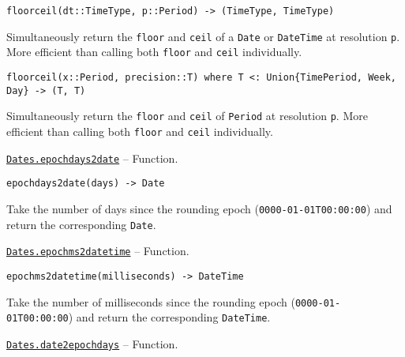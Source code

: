 \begin{adjustwidth}{2em}{0pt}


\begin{verbatim}
floorceil(dt::TimeType, p::Period) -> (TimeType, TimeType)
\end{verbatim}

Simultaneously return the \texttt{floor} and \texttt{ceil} of a \texttt{Date} or \texttt{DateTime} at resolution \texttt{p}. More efficient than calling both \texttt{floor} and \texttt{ceil} individually.




\begin{lstlisting}
floorceil(x::Period, precision::T) where T <: Union{TimePeriod, Week, Day} -> (T, T)
\end{lstlisting}

Simultaneously return the \texttt{floor} and \texttt{ceil} of \texttt{Period} at resolution \texttt{p}.  More efficient than calling both \texttt{floor} and \texttt{ceil} individually.



\end{adjustwidth}
\hypertarget{6172851707225539496}{}
\hyperlink{6172851707225539496}{\texttt{Dates.epochdays2date}}  -- {Function.}

\begin{adjustwidth}{2em}{0pt}


\begin{verbatim}
epochdays2date(days) -> Date
\end{verbatim}

Take the number of days since the rounding epoch (\texttt{0000-01-01T00:00:00}) and return the corresponding \texttt{Date}.



\end{adjustwidth}
\hypertarget{228819666916608027}{}
\hyperlink{228819666916608027}{\texttt{Dates.epochms2datetime}}  -- {Function.}

\begin{adjustwidth}{2em}{0pt}


\begin{verbatim}
epochms2datetime(milliseconds) -> DateTime
\end{verbatim}

Take the number of milliseconds since the rounding epoch (\texttt{0000-01-01T00:00:00}) and return the corresponding \texttt{DateTime}.



\end{adjustwidth}
\hypertarget{4031977144092247953}{}
\hyperlink{4031977144092247953}{\texttt{Dates.date2epochdays}}  -- {Function.}

